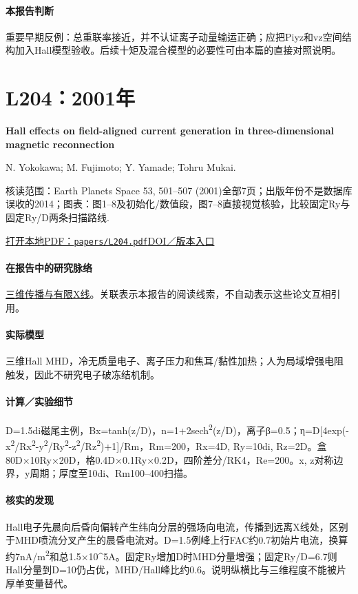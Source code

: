 \paragraph{本报告判断}重要早期反例：总重联率接近，并不认证离子动量输运正确；应把Piyz和vz空间结构加入Hall模型验收。后续十矩及混合模型的必要性可由本篇的直接对照说明。

\section{L204：2001年}\label{paper:L204}

\textbf{Hall effects on field-aligned current generation in three-dimensional magnetic reconnection}\citep{L204}\

N. Yokokawa;  M. Fujimoto;  Y. Yamade;  Tohru Mukai.

\textsf{核读范围：}Earth Planets Space 53, 501–507 (2001)全部7页；出版年份不是数据库误收的2014；\textsf{图表：}图1–8及初始化/数值段，图7–8直接视觉核验，比较固定Ry与固定Ry/D两条扫描路线.

\href{run:papers/L204.pdf}{打开本地PDF：\texttt{papers/L204.pdf}}\quad\href{https://doi.org/10.1186/bf03353262}{DOI／版本入口}

\paragraph{在报告中的研究脉络}\hyperref[story:three]{三维传播与有限X线}。关联表示本报告的阅读线索，不自动表示这些论文互相引用。

\paragraph{实际模型}三维Hall MHD，冷无质量电子、离子压力和焦耳/黏性加热；人为局域增强电阻触发，因此不研究电子破冻结机制。

\paragraph{计算／实验细节}D=1.5di磁尾主例，Bx=tanh(z/D)，n=1+2sech\textsuperscript{2}(z/D)，离子β=0.5；η=D[4exp(-x\textsuperscript{2}/Rx\textsuperscript{2}-y\textsuperscript{2}/Ry\textsuperscript{2}-z\textsuperscript{2}/Rz\textsuperscript{2})+1]/Rm，Rm=200，Rx=4D, Ry=10di, Rz=2D。盒80D×10Ry×20D，格0.4D×0.1Ry×0.2D，四阶差分/RK4，Re=200。x, z对称边界，y周期；厚度至10di、Rm100–400扫描。

\paragraph{核实的发现}Hall电子先晨向后昏向偏转产生纬向分层的强场向电流，传播到远离X线处，区别于MHD喷流分叉产生的晨昏电流对。D=1.5例峰上行FAC约0.7初始片电流，换算约7nA/m\textsuperscript{2}和总1.5×10\textasciicircum{}5A。固定Ry增加D时MHD分量增强；固定Ry/D=6.7则Hall分量到D=10仍占优，MHD/Hall峰比约0.6。说明纵横比与三维程度不能被片厚单变量替代。

